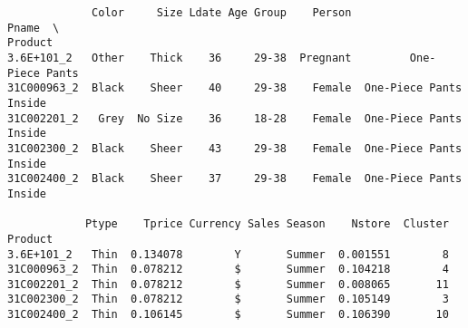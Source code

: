 \documentclass[11pt]{article}
\begin{document}
    
    \begin{verbatim}
             Color     Size Ldate Age Group    Person                   Pname  \
Product                                                                         
3.6E+101_2   Other    Thick    36     29-38  Pregnant         One-Piece Pants   
31C000963_2  Black    Sheer    40     29-38    Female  One-Piece Pants Inside   
31C002201_2   Grey  No Size    36     18-28    Female  One-Piece Pants Inside   
31C002300_2  Black    Sheer    43     29-38    Female  One-Piece Pants Inside   
31C002400_2  Black    Sheer    37     29-38    Female  One-Piece Pants Inside   

            Ptype    Tprice Currency Sales Season    Nstore  Cluster  
Product                                                               
3.6E+101_2   Thin  0.134078        Y       Summer  0.001551        8  
31C000963_2  Thin  0.078212        $       Summer  0.104218        4  
31C002201_2  Thin  0.078212        $       Summer  0.008065       11  
31C002300_2  Thin  0.078212        $       Summer  0.105149        3  
31C002400_2  Thin  0.106145        $       Summer  0.106390       10  
    \end{verbatim}
\end{document}
